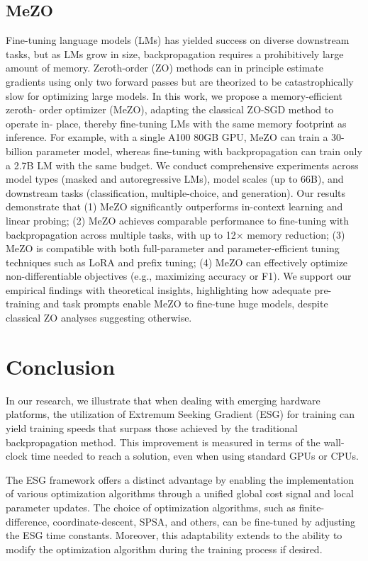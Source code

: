 \documentclass[nohyperref]{article}
\theoremstyle{plain}
\theoremstyle{definition}
\theoremstyle{remark}
\begin{document}
\subsection{MeZO}
Fine-tuning language models (LMs) has yielded success on diverse downstream
tasks, but as LMs grow in size, backpropagation requires a prohibitively large
amount of memory. Zeroth-order (ZO) methods can in principle estimate gradients
using only two forward passes but are theorized to be catastrophically slow for
optimizing large models. In this work, we propose a memory-efficient zeroth-
order optimizer (MeZO), adapting the classical ZO-SGD method to operate in-
place, thereby fine-tuning LMs with the same memory footprint as inference. For
example, with a single A100 80GB GPU, MeZO can train a 30-billion parameter
model, whereas fine-tuning with backpropagation can train only a 2.7B LM with
the same budget. We conduct comprehensive experiments across model types
(masked and autoregressive LMs), model scales (up to 66B), and downstream tasks
(classification, multiple-choice, and generation). Our results demonstrate that (1)
MeZO significantly outperforms in-context learning and linear probing; (2) MeZO
achieves comparable performance to fine-tuning with backpropagation across
multiple tasks, with up to 12× memory reduction; (3) MeZO is compatible with
both full-parameter and parameter-efficient tuning techniques such as LoRA and
prefix tuning; (4) MeZO can effectively optimize non-differentiable objectives (e.g.,
maximizing accuracy or F1). We support our empirical findings with theoretical
insights, highlighting how adequate pre-training and task prompts enable MeZO to
fine-tune huge models, despite classical ZO analyses suggesting otherwise.
\section{Conclusion}
In our research, we illustrate that when dealing with emerging hardware platforms, the utilization of Extremum Seeking Gradient (ESG) for training can yield training speeds that surpass those achieved by the traditional backpropagation method. This improvement is measured in terms of the wall-clock time needed to reach a solution, even when using standard GPUs or CPUs.

The ESG framework offers a distinct advantage by enabling the implementation of various optimization algorithms through a unified global cost signal and local parameter updates. The choice of optimization algorithms, such as finite-difference, coordinate-descent, SPSA, and others, can be fine-tuned by adjusting the ESG time constants. Moreover, this adaptability extends to the ability to modify the optimization algorithm during the training process if desired.
\end{document}
